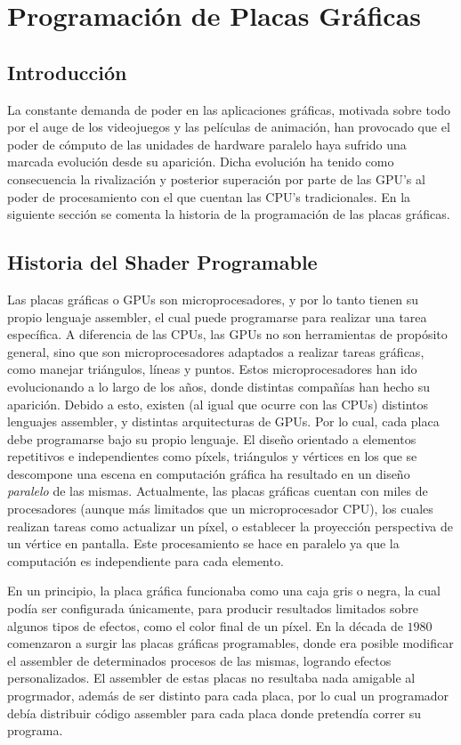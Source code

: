 \chapter{Programación de Placas Gráficas}

\section{Introducci\'on}
La constante demanda de poder en las aplicaciones gr\'aficas, motivada sobre todo por el auge de los videojuegos y las películas de animación, han provocado que el poder de cómputo de las unidades de hardware paralelo haya sufrido una marcada evoluci\'on desde su aparici\'on.
Dicha evoluci\'on ha tenido como consecuencia la rivalizaci\'on y posterior superaci\'on por parte de las GPU's al poder de procesamiento con el que cuentan las CPU's tradicionales\cite{Harris06}.
En la siguiente sección se comenta la historia de la programación de las placas gráficas.

\section{Historia del Shader Programable}
Las placas gráficas o GPUs son microprocesadores, y por lo tanto tienen su propio lenguaje assembler, el cual puede programarse para realizar una tarea específica.
A diferencia de las CPUs, las GPUs no son herramientas de propósito general, sino que son microprocesadores adaptados a realizar tareas gráficas, como manejar triángulos, líneas y puntos.
Estos microprocesadores han ido evolucionando a lo largo de los años, donde distintas compañías han hecho su aparición.
Debido a esto, existen (al igual que ocurre con las CPUs) distintos lenguajes assembler, y distintas arquitecturas de GPUs.
Por lo cual, cada placa debe programarse bajo su propio lenguaje.
El diseño orientado a elementos repetitivos e independientes como píxels, triángulos y vértices en los que se descompone una escena en computación gráfica ha resultado en un diseño {\em paralelo} de las mismas.
Actualmente, las placas gráficas cuentan con miles de procesadores (aunque más limitados que un microprocesador CPU), los cuales realizan tareas como actualizar un píxel, o establecer la proyección perspectiva de un vértice en pantalla.
Este procesamiento se hace en paralelo ya que la computación es independiente para cada elemento.

En un principio, la placa gráfica funcionaba como una caja gris o negra, la cual podía ser configurada únicamente, para producir resultados limitados sobre algunos tipos de efectos, como el color final de un píxel.
En la década de $1980$ comenzaron a surgir las placas gráficas programables, donde era posible modificar el assembler de determinados procesos de las mismas, logrando efectos personalizados.
El assembler de estas placas no resultaba nada amigable al progrmador, además de ser distinto para cada placa, por lo cual un programador debía distribuir código assembler para cada placa donde pretendía correr su programa.

